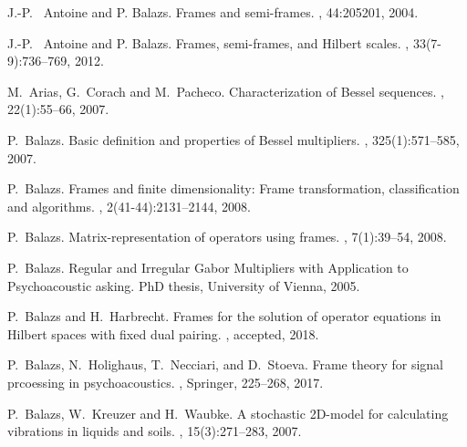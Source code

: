 \documentclass{birkjour}
\theoremstyle{definition}
\theoremstyle{remark}
\numberwithin{equation}{section}
\begin{document}
\begin{thebibliography}{10}



J.-P.~ Antoine and P. Balazs.
\newblock  Frames and semi-frames.
, 44:205201, 2004.





J.-P.~ Antoine and P. Balazs.
\newblock  Frames, semi-frames, and {H}ilbert scales.
, 33(7-9):736--769, 2012.


M.~Arias, G.~Corach and M.~Pacheco.
\newblock  Characterization of {B}essel sequences.
, 22(1):55--66, 2007.


P.~Balazs.
\newblock  Basic definition and properties of {B}essel multipliers.
, 325(1):571--585,  2007.



P.~Balazs.
\newblock  Frames and finite dimensionality: Frame transformation,
  classification and algorithms.
, 2(41-44):2131--2144, 2008.


P.~Balazs.
\newblock  Matrix-representation of operators using frames.
, 
 7(1):39--54,  2008.


P.~Balazs.
\newblock  Regular and Irregular Gabor Multipliers with Application to Psychoacoustic asking.
\newblock PhD thesis, University of Vienna, 2005.



P.~Balazs and H.~Harbrecht.
\newblock  Frames for the solution of operator equations in {H}ilbert spaces with fixed dual pairing.
, 
accepted, 2018.



P.~Balazs, N.~Holighaus, T.~Necciari, and D.~Stoeva.
\newblock  Frame theory for signal prcoessing in psychoacoustics.
, Springer,
 225--268, 2017.

 
P.~Balazs, W.~Kreuzer and H.~Waubke.
\newblock  A stochastic 2{D}-model for
  calculating vibrations in liquids and soils.
, 15(3):271--283, 2007.





\end{thebibliography}
\end{document}
